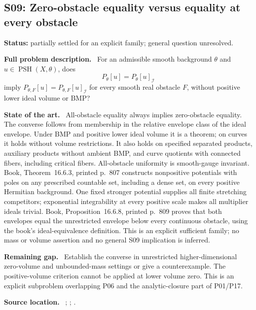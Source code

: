 \documentclass[11pt]{article}
\newcommand{\PSH}{\operatorname{PSH}}
\newcommand{\field}[1]{\par\medskip\noindent\textbf{#1.}\ }
\begin{document}
\subsection{S09: Zero-obstacle equality versus equality at every obstacle}
\label{S09}
\noindent\textbf{Status:} partially settled for an explicit family; general question unresolved.
\field{Full problem description} For an admissible smooth background $\theta$ and $u\in\PSH(X,\theta)$, does
\[P_\theta[u]=P_\theta[u]_{\mathcal I}\]
imply $P_{\theta,F}[u]=P_{\theta,F}[u]_{\mathcal I}$ for every smooth real obstacle $F$, without positive lower ideal volume or BMP?
\field{State of the art} All-obstacle equality always implies zero-obstacle equality. The converse follows from membership in the relative envelope class of the ideal envelope. Under BMP and positive lower ideal volume it is a theorem; on curves it holds without volume restrictions. It also holds on specified separated products, auxiliary products without ambient BMP, and curve quotients with connected fibers, including critical fibers. All-obstacle uniformity is smooth-gauge invariant.
 Book, Theorem~16.6.3, printed p.~807 constructs nonpositive potentials with poles on any prescribed countable set, including a dense set, on every positive Hermitian background. One fixed stronger potential supplies all finite stretching competitors; exponential integrability at every positive scale makes all multiplier ideals trivial. Book, Proposition~16.6.8, printed p.~809 proves that both envelopes equal the unrestricted envelope below every continuous obstacle, using the book's ideal-equivalence definition. This is an explicit sufficient family; no mass or volume assertion and no general S09 implication is inferred.
\field{Remaining gap} Establish the converse in unrestricted higher-dimensional zero-volume and unbounded-mass settings or give a counterexample. The positive-volume criterion cannot be applied at lower volume zero. This is an explicit subproblem overlapping P06 and the analytic-closure part of P01/P17.
\field{Source location} ; ; .
\end{document}

